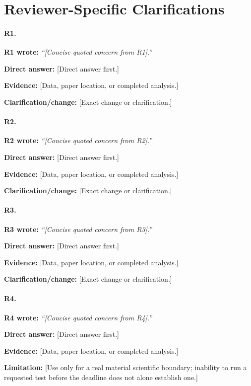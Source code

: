 \documentclass[10pt]{article}
\newcommand{\rlabel}[2]{\textbf{\textcolor{#1}{#2}}}
\newcommand{\quotedconcern}[3]{\par\noindent\textcolor{#1}{\textbf{#2 wrote:}} \emph{``#3''}\par}
\newcommand{\directanswer}[1]{\par\noindent\textbf{Direct answer:} #1\par}
\newcommand{\evidence}[1]{\par\noindent\textbf{Evidence:} #1\par}
\newcommand{\change}[1]{\par\noindent\textbf{Clarification/change:} #1\par}
\newcommand{\limitation}[1]{\par\noindent\textbf{Limitation:} #1\par}
\begin{document}
\section*{Reviewer-Specific Clarifications}

\paragraph{\rlabel{revone}{R1}.}
\quotedconcern{revone}{R1}{[Concise quoted concern from R1].}
\directanswer{[Direct answer first.]}
\evidence{[Data, paper location, or completed analysis.]}
\change{[Exact change or clarification.]}

\paragraph{\rlabel{revtwo}{R2}.}
\quotedconcern{revtwo}{R2}{[Concise quoted concern from R2].}
\directanswer{[Direct answer first.]}
\evidence{[Data, paper location, or completed analysis.]}
\change{[Exact change or clarification.]}

\paragraph{\rlabel{revthree}{R3}.}
\quotedconcern{revthree}{R3}{[Concise quoted concern from R3].}
\directanswer{[Direct answer first.]}
\evidence{[Data, paper location, or completed analysis.]}
\change{[Exact change or clarification.]}

\paragraph{\rlabel{revfour}{R4}.}
\quotedconcern{revfour}{R4}{[Concise quoted concern from R4].}
\directanswer{[Direct answer first.]}
\evidence{[Data, paper location, or completed analysis.]}
\limitation{[Use only for a real material scientific boundary; inability to run a requested test before the deadline does not alone establish one.]}
\end{document}
